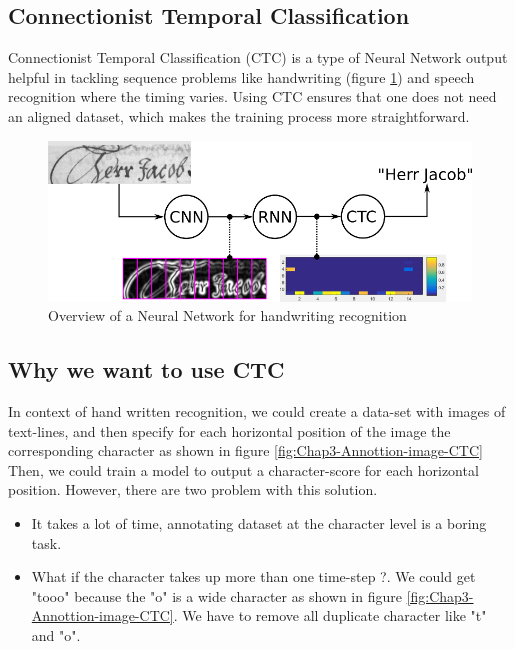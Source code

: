 \subsection{ Connectionist Temporal Classification }
Connectionist Temporal Classification (CTC) \cite{hannun2017sequence} is a type of Neural Network output helpful
in tackling sequence problems like handwriting (figure \ref{fig:Chap3-Overview-CTC}) and speech recognition where the timing varies.
Using CTC ensures that one does not need an aligned dataset, which makes the training process
more straightforward.
\begin{figure}[H]
	\centering
	\includegraphics[width=\textwidth]{img/Chap3/Overview-CTC}
	\caption{ Overview of a Neural Network for handwriting recognition }
	\label{fig:Chap3-Overview-CTC}
\end{figure}

\subsection{ Why we want to use CTC }
In context of hand written recognition, we could create a data-set with
images of text-lines, and then specify for each horizontal position of the image
the corresponding character as shown in figure \ref{fig:Chap3-Annottion-image-CTC} Then, we could train a model to output
a character-score for each horizontal position. However, there are two problem with this
solution.
\begin{itemize}
	\item It takes a lot of time, annotating dataset at the character level is a boring task.
	\item What if the character takes up more than one time-step ?. We could get "tooo" because
	      the "o" is a wide character as shown in figure \ref{fig:Chap3-Annottion-image-CTC}. We have to remove all duplicate character
	      like "t" and "o".
\end{itemize}

